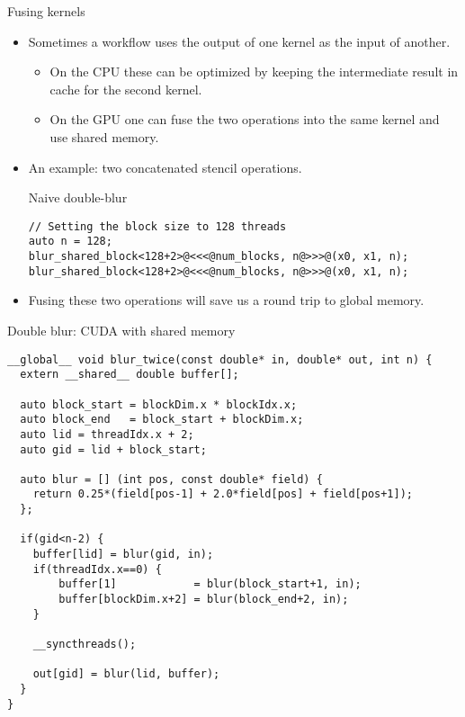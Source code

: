 \documentclass[aspectratio=43]{beamer}
\begin{document}
\begin{frame}[fragile]{Fusing kernels}
    \begin{itemize}
        \item Sometimes a workflow uses the output of one kernel as the input of another.
        \begin{itemize}
            \item On the CPU these can be optimized by keeping the intermediate result in cache for the second kernel.
            \item On the GPU one can fuse the two operations into the same kernel and use shared memory.
        \end{itemize}
        \item An example: two concatenated stencil operations.
    \begin{code}{Naive double-blur}
        \begin{lstlisting}[style=boxcudatiny]
// Setting the block size to 128 threads
auto n = 128;
blur_shared_block<128+2>@<<<@num_blocks, n@>>>@(x0, x1, n);
blur_shared_block<128+2>@<<<@num_blocks, n@>>>@(x0, x1, n);
        \end{lstlisting}
    \end{code}
        \item Fusing these two operations will save us a round trip to global memory.
    \end{itemize}
\end{frame}


\begin{frame}[fragile]{}
    \begin{code}{Double blur: CUDA with shared memory}
        \begin{lstlisting}[style=boxcudatiny]
__global__ void blur_twice(const double* in, double* out, int n) {
  extern __shared__ double buffer[];

  auto block_start = blockDim.x * blockIdx.x;
  auto block_end   = block_start + blockDim.x;
  auto lid = threadIdx.x + 2;
  auto gid = lid + block_start;

  auto blur = [] (int pos, const double* field) {
    return 0.25*(field[pos-1] + 2.0*field[pos] + field[pos+1]);
  };

  if(gid<n-2) {
    buffer[lid] = blur(gid, in);
    if(threadIdx.x==0) {
        buffer[1]            = blur(block_start+1, in);
        buffer[blockDim.x+2] = blur(block_end+2, in);
    }

    __syncthreads();

    out[gid] = blur(lid, buffer);
  }
}
        \end{lstlisting}
    \end{code}
\end{frame}
\end{document}
